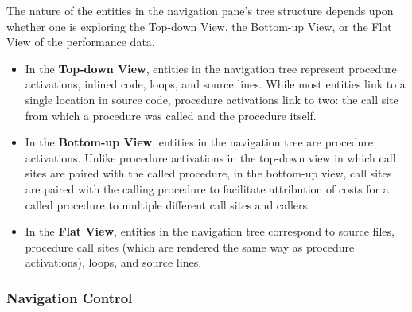 The nature of the entities in the navigation pane's tree structure depends upon whether one is exploring the Top-down View, the Bottom-up View, or the Flat View of the performance data.
\begin{itemize}
\item In the \textbf{Top-down View}, entities in the navigation tree represent procedure activations, inlined code, loops, and source lines.
  While most entities link to a single location in source code, procedure activations link to two: the call site from which a procedure was called and the procedure itself.

\item In the \textbf{Bottom-up View}, entities in the navigation tree are procedure activations.
  Unlike procedure activations in the top-down view in which call sites are paired with the called procedure, in the bottom-up view, call sites are paired with the calling procedure to facilitate attribution of costs for a called procedure to multiple different call sites and callers.

\item In the \textbf{Flat View}, entities in the navigation tree correspond to source files, procedure call sites (which are rendered the same way as procedure activations), loops, and source lines.
\end{itemize}

\subsubsection{Navigation Control}

